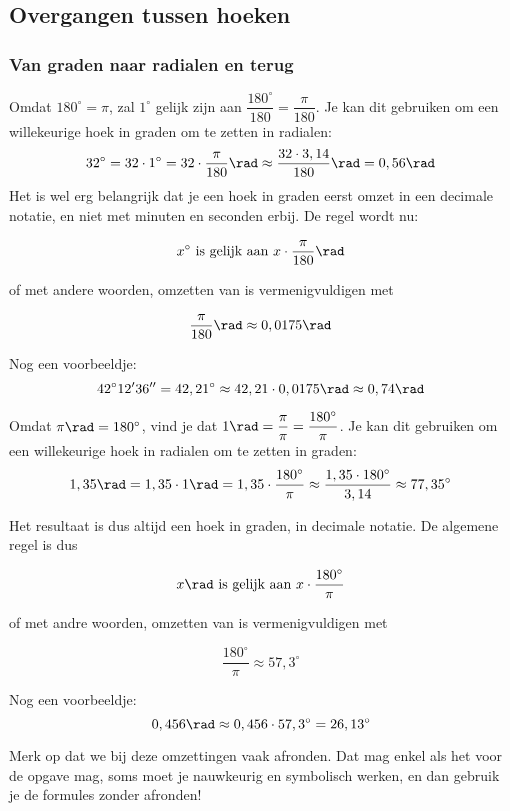 \documentclass[a4paper,12pt]{article}
\begin{document}
\subsection{Overgangen tussen hoeken}

\subsubsection{Van graden naar radialen en terug}

Omdat $180^\circ = \pi$, zal $1^\circ$ gelijk zijn aan $\dfrac{180^\circ}{180}=\dfrac{\pi}{180}$. Je kan dit gebruiken om een willekeurige hoek in graden om te zetten in radialen:
\[32^\circ = 32\cdot 1^\circ = 32 \cdot \frac{\pi}{180} \rad\approx \frac{32\cdot 3,14}{180}\rad=0,56\rad\]
Het is wel erg belangrijk dat je een hoek in graden eerst omzet in een decimale notatie, en niet met minuten en seconden erbij. De regel wordt nu:
\begin{framed}
\[x^\circ \textup{ is gelijk aan } x\cdot \frac{\pi}{180} \rad\]
\end{framed}
of met andere woorden, omzetten van  is vermenigvuldigen met
\begin{framed}
\[\dfrac{\pi}{180}\rad\approx 0,0175\rad\]
\end{framed}

Nog een voorbeeldje:
\[42^\circ12'36''=42,21^\circ\approx 42,21 \cdot 0,0175 \rad\approx 0,74 \rad\]

Omdat $\pi \rad = 180^\circ$, vind je dat $1 \rad = \dfrac{\pi}{\pi}=\dfrac{180^\circ}{\pi}$. Je kan dit gebruiken om een willekeurige hoek in radialen om te zetten in graden:
\[1,35 \rad = 1,35 \cdot 1 \rad = 1,35 \cdot \frac{180^\circ}{\pi}\approx \frac{1,35 \cdot 180^\circ}{3,14}\approx 77,35^\circ\]

Het resultaat is dus altijd een hoek in graden, in decimale notatie.  De algemene regel is dus
\begin{framed}
\[x \rad \textup{ is gelijk aan } x\cdot \frac{180^\circ}{\pi}\]
\end{framed}
of met andre woorden, omzetten van  is vermenigvuldigen met
\begin{framed}
\[
\frac{180^\circ}{\pi} \approx 57,3^\circ
\]
\end{framed}

Nog een voorbeeldje:
\[0,456 \rad \approx 0,456 \cdot 57,3^\circ = 26,13^\circ\]

Merk op dat we bij deze omzettingen vaak afronden. Dat mag enkel als het voor de opgave mag, soms moet je nauwkeurig en symbolisch werken, en dan gebruik je de formules zonder afronden!
\end{document}
